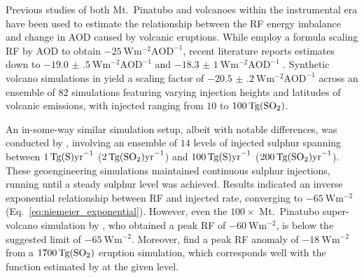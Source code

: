 \documentclass[draft]{agujournal2019}
\newcommand{\iso}[1][i]{{#1}njected \ce{SO2}}
\begin{document}
Previous studies of both Mt.\ Pinatubo \cite{mills2017,hansen2005} and volcanoes within
the instrumental era \cite{gregory2016} have been used to estimate the relationship
between the RF energy imbalance and change in AOD caused by volcanic eruptions. While
 employ a formula scaling RF by AOD to obtain
\(\SI{-25}{\watt\metre^{-2}\mathrm{AOD}^{-1}}\), recent literature reports estimates
down to \(\SI{-19.0(5)}{\watt\metre^{-2}\mathrm{AOD}^{-1}}\) \cite{gregory2016} and
\(\SI{-18.3(10)}{\watt\metre^{-2}\mathrm{AOD}^{-1}}\) \cite{mills2017}. Synthetic
volcano simulations in  yield a scaling factor of
\(\SI{-20.5(2)}{\watt\metre^{-2}\mathrm{AOD}^{-1}}\) across an ensemble of \(82\)
simulations featuring varying injection heights and latitudes of volcanic emissions,
with \iso{} ranging from \(10\) to \(\SI{100}{\tera\gram(\ce{SO2})}\).

An in-some-way similar simulation setup, albeit with notable differences, was conducted
by , involving an ensemble of \(14\) levels of injected sulphur
spanning between \(\SI{1}{\tera\gram(\ce{S})\mathrm{yr}^{-1}}\)
(\(\SI{2}{\tera\gram(\ce{SO2})\mathrm{yr}^{-1}}\)) and
\(\SI{100}{\tera\gram(\ce{S})\mathrm{yr}^{-1}}\)
(\(\SI{200}{\tera\gram(\ce{SO2})\mathrm{yr}^{-1}}\)). These geoengineering simulations
maintained continuous sulphur injections, running until a steady sulphur level was
achieved. Results indicated an inverse exponential relationship between RF and \iso{}
rate, converging to \(\SI{-65}{\watt\metre^{-2}}\) (Eq.~\ref{eq:niemeier_exponential}).
However, even the \(100\times\) Mt.\ Pinatubo super-volcano simulation by
, who obtained a peak RF of \(\SI{-60}{\watt\metre^{-2}}\), is below
the suggested limit of \(\SI{-65}{\watt\metre^{-2}}\). Moreover, 
find a peak RF anomaly of \(\SI{-18}{\watt\metre^{-2}}\) from a
\(\SI{1700}{\tera\gram(\ce{SO2})}\) eruption simulation, which corresponds well with the
function estimated by  at the given  level.
\end{document}
